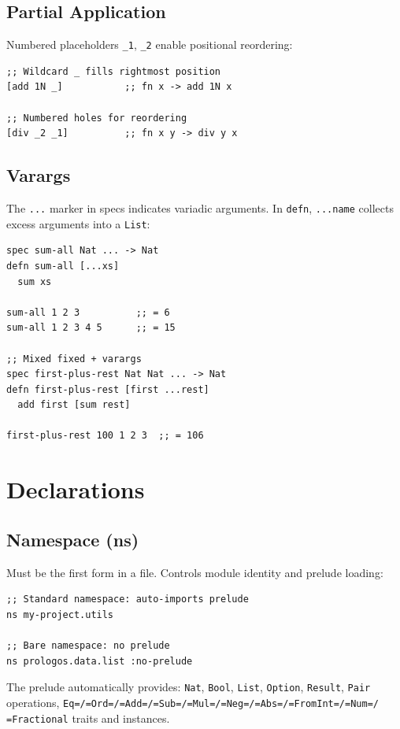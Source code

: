 \documentclass[11pt]{article}
\begin{document}
\subsection{Partial Application}
\label{sec:orge3be61e}

Numbered placeholders \texttt{\_1}, \texttt{\_2} enable positional reordering:

\begin{verbatim}
;; Wildcard _ fills rightmost position
[add 1N _]           ;; fn x -> add 1N x

;; Numbered holes for reordering
[div _2 _1]          ;; fn x y -> div y x
\end{verbatim}
\subsection{Varargs}
\label{sec:org1eabae2}

The \texttt{...} marker in specs indicates variadic arguments. In \texttt{defn}, \texttt{...name}
collects excess arguments into a \texttt{List}:

\begin{verbatim}
spec sum-all Nat ... -> Nat
defn sum-all [...xs]
  sum xs

sum-all 1 2 3          ;; = 6
sum-all 1 2 3 4 5      ;; = 15

;; Mixed fixed + varargs
spec first-plus-rest Nat Nat ... -> Nat
defn first-plus-rest [first ...rest]
  add first [sum rest]

first-plus-rest 100 1 2 3  ;; = 106
\end{verbatim}
\section{Declarations}
\label{sec:org81b4991}

\subsection{Namespace (ns)}
\label{sec:org8c7a2b8}

Must be the first form in a file. Controls module identity and prelude loading:

\begin{verbatim}
;; Standard namespace: auto-imports prelude
ns my-project.utils

;; Bare namespace: no prelude
ns prologos.data.list :no-prelude
\end{verbatim}

The prelude automatically provides: \texttt{Nat}, \texttt{Bool}, \texttt{List}, \texttt{Option}, \texttt{Result},
\texttt{Pair} operations, \texttt{Eq=/=Ord=/=Add=/=Sub=/=Mul=/=Neg=/=Abs=/=FromInt=/=Num=/
=Fractional} traits and instances.
\end{document}
